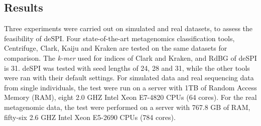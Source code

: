 \documentclass[a0,portrait]{a0poster}
\begin{document}
\begin{multicols}{2}
%
%
%
%
%
%


\section*{Results}
Three experiments were carried out on simulated and real datasets, to assess the feasibility of deSPI. Four state-of-the-art metagenomics classification tools, Centrifuge, Clark, Kaiju and Kraken are tested on the same datasets for comparison. The \textit{k-mer} used for indices of Clark and Kraken, and RdBG of deSPI is 31. deSPI was tested with seed lengths of 24, 28 and 31, while the other tools were ran with their default settings. For simulated data and real sequencing data from single individuals, the test were run on a server with 1TB of Random Access Memory (RAM), eight 2.0 GHZ Intel Xeon E7-4820 CPUs (64 cores). For the real metagenomic data, the test were performed on a server with 767.8 GB of RAM, fifty-six 2.6 GHZ Intel Xeon E5-2690 CPUs (784 cores). 


\end{multicols}
\end{document}
